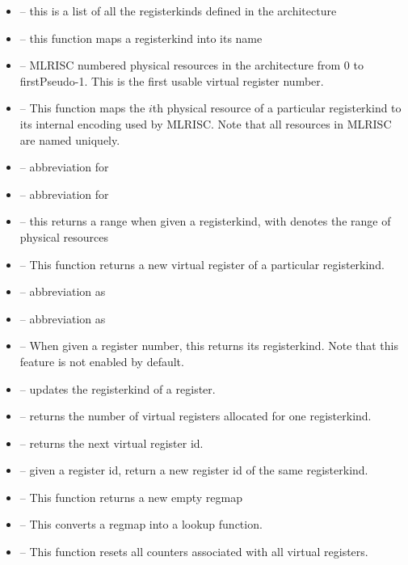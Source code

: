 \begin{itemize}
  \item{} -- this is a list of all the registerkinds defined in the
architecture
  \item{} -- this function maps a registerkind into its name
  \item{} -- MLRISC numbered physical resources
   in the architecture from 0 to firstPseudo-1.  
   This is the first usable virtual register number.
  \item{} -- This function maps the $i$th physical
   resource of a particular registerkind to its internal encoding used by MLRISC.
   Note that all resources in MLRISC are named uniquely.
  \item{} -- abbreviation for  
  \item{} -- abbreviation for  
  \item {} -- this returns a range 
   when given a registerkind, with denotes the range of physical resources
  \item {}  -- This function returns a new virtual register 
   of a particular registerkind.
  \item {} -- abbreviation as 
  \item {} -- abbreviation as 
  \item {}  -- When given a register number, this returns its
    registerkind.  Note that this feature is not enabled by default.
  \item {} -- updates the registerkind of a register.
  \item {} -- returns the number of virtual registers allocated for one registerkind.
  \item {} --  returns the next virtual register id.
  \item {}  -- given a register id, return a new register id of
     the same registerkind.
  \item {} -- This function returns a new empty regmap
  \item {} -- This converts a regmap into a lookup function.
  \item {} -- This function resets all counters associated
with all virtual registers.
\end{itemize}

